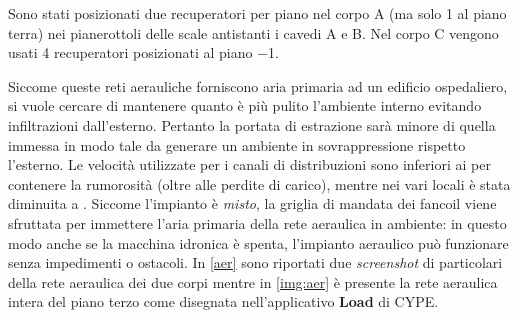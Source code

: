 Sono stati posizionati due recuperatori per piano nel corpo A (ma solo \num{1} al piano terra) nei pianerottoli delle scale antistanti i cavedi A e B. Nel corpo C vengono usati 4 recuperatori posizionati al piano \num{-1}.

Siccome queste reti aerauliche forniscono aria primaria ad un edificio ospedaliero, si vuole cercare di mantenere quanto è più pulito l'ambiente interno evitando infiltrazioni dall'esterno. Pertanto la portata di estrazione sarà minore di quella immessa in modo tale da generare un ambiente in sovrappressione rispetto l'esterno. Le velocità utilizzate per i canali di distribuzioni sono inferiori ai  per contenere la rumorosità (oltre alle perdite di carico), mentre nei vari locali è stata diminuita a . Siccome l'impianto è \emph{misto}, la griglia di mandata dei fancoil viene sfruttata per immettere l'aria primaria della rete aeraulica in ambiente: in questo modo anche se la macchina idronica è spenta, l'impianto aeraulico può funzionare senza impedimenti o ostacoli. In \vref{aer} sono riportati due \emph{screenshot} di particolari della rete aeraulica dei due corpi mentre in \vref{img:aer} è presente la rete aeraulica intera del piano terzo come disegnata nell'applicativo \textbf{Load} di CYPE. 

